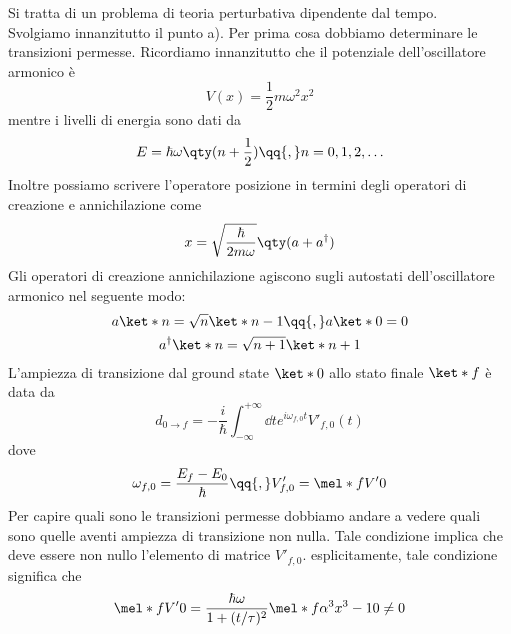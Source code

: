 \begin{soluzione}
   Si tratta di un problema di teoria perturbativa dipendente dal tempo.\\
   Svolgiamo innanzitutto il punto a). Per prima cosa dobbiamo determinare le transizioni permesse. Ricordiamo innanzitutto che il potenziale dell'oscillatore armonico è
   \begin{equation*}
      V(x)=\frac{1}{2}m\omega^2 x^2
   \end{equation*}
   mentre i livelli di energia sono dati da
   \begin{equation*}
      E=\hbar\omega \qty(n + \frac{1}{2})
      \qq{,}
      n=0,1,2,\ldots
   \end{equation*}
   Inoltre possiamo scrivere l'operatore posizione in termini degli operatori di creazione e annichilazione come
   \begin{equation*}
      x=\sqrt{\frac{\hbar}{2m\omega}} \qty( a + a^{\dag} )
   \end{equation*}
   Gli operatori di creazione annichilazione agiscono sugli autostati dell'oscillatore armonico nel seguente modo:
   \begin{gather*}
      a \ket*{n}
      =\sqrt{n} \ket*{n - 1}
      \qq{,}
      a \ket*{0}=0
      \\
      a^{\dag} \ket*{n}
      =\sqrt{n + 1} \ket*{n + 1}
   \end{gather*}
   L'ampiezza di transizione dal ground state $\ket*{0}$ allo stato finale $\ket*{f}$ è data da
   \begin{equation*}
      d_{0 \to f}
      =-\frac{i}{\hbar} \int_{-\infty}^{+\infty} \dd{t} e^{i \omega_{f,0} t} V'_{f,0}(t)
   \end{equation*}
   dove
   \begin{equation*}
      \omega_{f,0}
      =\frac{E_f - E_0}{\hbar}
      \qq{,}
      V'_{f,0}
      =\mel*{f}{V'}{0}
   \end{equation*}
   Per capire quali sono le transizioni permesse dobbiamo andare a vedere quali sono quelle aventi ampiezza di transizione non nulla. Tale condizione implica che deve essere non nullo l'elemento di matrice $V'_{f,0}$. esplicitamente, tale condizione significa che
   \begin{gather*}
      \mel*{f}{V'}{0}
      =\frac{\hbar\omega}{1 + (t/\tau)^2} \mel*{f}{\alpha^3 x^3 - 1}{0}
      \neq 0
      \\[0.1cm]

\end{gather*}
\end{soluzione}
